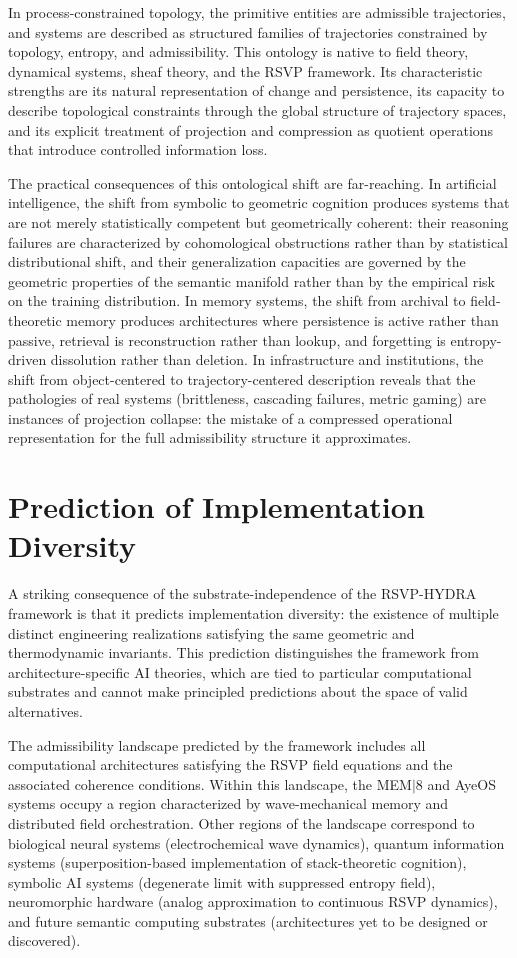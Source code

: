 \documentclass[12pt, a4paper, openany]{book}
\theoremstyle{plain}
\theoremstyle{definition}
\theoremstyle{remark}
\begin{document}
In process-constrained topology, the primitive entities are admissible trajectories, and systems are described as structured families of trajectories constrained by topology, entropy, and admissibility. This ontology is native to field theory, dynamical systems, sheaf theory, and the RSVP framework. Its characteristic strengths are its natural representation of change and persistence, its capacity to describe topological constraints through the global structure of trajectory spaces, and its explicit treatment of projection and compression as quotient operations that introduce controlled information loss.

The practical consequences of this ontological shift are far-reaching. In artificial intelligence, the shift from symbolic to geometric cognition produces systems that are not merely statistically competent but geometrically coherent: their reasoning failures are characterized by cohomological obstructions rather than by statistical distributional shift, and their generalization capacities are governed by the geometric properties of the semantic manifold rather than by the empirical risk on the training distribution. In memory systems, the shift from archival to field-theoretic memory produces architectures where persistence is active rather than passive, retrieval is reconstruction rather than lookup, and forgetting is entropy-driven dissolution rather than deletion. In infrastructure and institutions, the shift from object-centered to trajectory-centered description reveals that the pathologies of real systems (brittleness, cascading failures, metric gaming) are instances of projection collapse: the mistake of a compressed operational representation for the full admissibility structure it approximates.

\section{Prediction of Implementation Diversity}

A striking consequence of the substrate-independence of the RSVP-HYDRA framework is that it predicts implementation diversity: the existence of multiple distinct engineering realizations satisfying the same geometric and thermodynamic invariants. This prediction distinguishes the framework from architecture-specific AI theories, which are tied to particular computational substrates and cannot make principled predictions about the space of valid alternatives.

The admissibility landscape predicted by the framework includes all computational architectures satisfying the RSVP field equations and the associated coherence conditions. Within this landscape, the MEM$|$8 and AyeOS systems occupy a region characterized by wave-mechanical memory and distributed field orchestration. Other regions of the landscape correspond to biological neural systems (electrochemical wave dynamics), quantum information systems (superposition-based implementation of stack-theoretic cognition), symbolic AI systems (degenerate limit with suppressed entropy field), neuromorphic hardware (analog approximation to continuous RSVP dynamics), and future semantic computing substrates (architectures yet to be designed or discovered).
\end{document}
